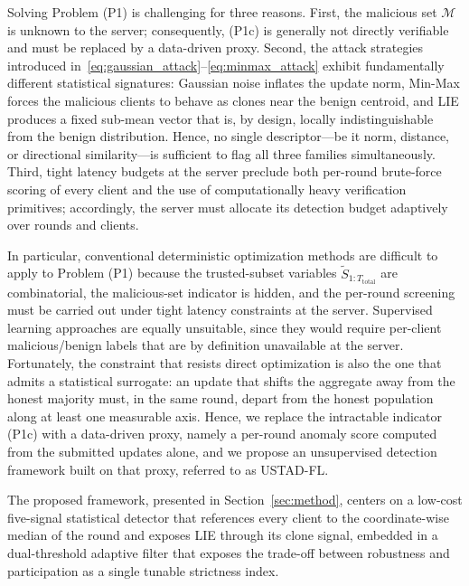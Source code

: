 \documentclass[journal]{IEEEtran}
\begin{document}
Solving Problem (P1) is challenging for three reasons. First, the malicious set $\mathcal{M}$ is unknown to the server; consequently, (P1c) is generally not directly verifiable and must be replaced by a data-driven proxy. Second, the attack strategies introduced in~\eqref{eq:gaussian_attack}--\eqref{eq:minmax_attack} exhibit fundamentally different statistical signatures: Gaussian noise inflates the update norm, Min-Max forces the malicious clients to behave as clones near the benign centroid, and LIE produces a fixed sub-mean vector that is, by design, locally indistinguishable from the benign distribution. Hence, no single descriptor—be it norm, distance, or directional similarity—is sufficient to flag all three families simultaneously. Third, tight latency budgets at the server preclude both per-round brute-force scoring of every client and the use of computationally heavy verification primitives; accordingly, the server must allocate its detection budget adaptively over rounds and clients.

In particular, conventional deterministic optimization methods are difficult to apply to Problem (P1) because the trusted-subset variables $\widetilde{S}_{1:T_{\text{total}}}$ are combinatorial, the malicious-set indicator is hidden, and the per-round screening must be carried out under tight latency constraints at the server. Supervised learning approaches are equally unsuitable, since they would require per-client malicious/benign labels that are by definition unavailable at the server. Fortunately, the constraint that resists direct optimization is also the one that admits a statistical surrogate: an update that shifts the aggregate away from the honest majority must, in the same round, depart from the honest population along at least one measurable axis. Hence, we replace the intractable indicator (P1c) with a data-driven proxy, namely a per-round anomaly score computed from the submitted updates alone, and we propose an unsupervised detection framework built on that proxy, referred to as USTAD-FL.

The proposed framework, presented in Section~\ref{sec:method}, centers on a low-cost five-signal statistical detector that references every client to the coordinate-wise median of the round and exposes LIE through its clone signal, embedded in a dual-threshold adaptive filter that exposes the trade-off between robustness and participation as a single tunable strictness index. 

\end{document}
